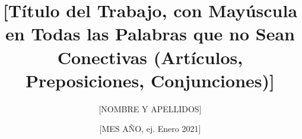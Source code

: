 \newcommand{\Estudios}{[ESTUDIOS, ej. Grado]}

\newcommand{\TituloEstudios}{[TÍTULO DE LOS ESTUDIOS, ej. Ingeniería Informática]}

\newcommand{\Departamento}{[DEPARTAMENTO, ej. Departamento de Lenguajes y Sistemas Informáticos e Ingeniería de Software]}

\newcommand{\NombreAutor}{[NOMBRE Y APELLIDOS]}

\newcommand{\NombreTutor}{[NOMBRE Y APELLIDOS]}

\newcommand{\TituloTFG}{[Título del Trabajo, con Mayúscula en Todas las Palabras que no Sean Conectivas (Artículos, Preposiciones, Conjunciones)]}

\newcommand{\Fecha}{[MES AÑO, ej. Enero 2021]}

\title{\TituloTFG}
\author{\NombreAutor}
\date{\Fecha}

